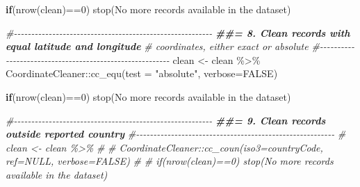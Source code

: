 \documentclass[
]{article}
\newenvironment{Shaded}{\begin{snugshade}}{\end{snugshade}}
\newcommand{\AttributeTok}[1]{\textcolor[rgb]{0.77,0.63,0.00}{#1}}
\newcommand{\CommentTok}[1]{\textcolor[rgb]{0.56,0.35,0.01}{\textit{#1}}}
\newcommand{\ConstantTok}[1]{\textcolor[rgb]{0.00,0.00,0.00}{#1}}
\newcommand{\ControlFlowTok}[1]{\textcolor[rgb]{0.13,0.29,0.53}{\textbf{#1}}}
\newcommand{\DecValTok}[1]{\textcolor[rgb]{0.00,0.00,0.81}{#1}}
\newcommand{\DocumentationTok}[1]{\textcolor[rgb]{0.56,0.35,0.01}{\textbf{\textit{#1}}}}
\newcommand{\FunctionTok}[1]{\textcolor[rgb]{0.00,0.00,0.00}{#1}}
\newcommand{\NormalTok}[1]{#1}
\newcommand{\OtherTok}[1]{\textcolor[rgb]{0.56,0.35,0.01}{#1}}
\newcommand{\SpecialCharTok}[1]{\textcolor[rgb]{0.00,0.00,0.00}{#1}}
\newcommand{\StringTok}[1]{\textcolor[rgb]{0.31,0.60,0.02}{#1}}
\begin{document}
\begin{Shaded}
\begin{Highlighting}[]
\ControlFlowTok{if}\NormalTok{(}\FunctionTok{nrow}\NormalTok{(clean)}\SpecialCharTok{==}\DecValTok{0}\NormalTok{) }\FunctionTok{stop}\NormalTok{(}\StringTok{\textquotesingle{}No more records available in the dataset\textquotesingle{}}\NormalTok{)}

\CommentTok{\#{-}{-}{-}{-}{-}{-}{-}{-}{-}{-}{-}{-}{-}{-}{-}{-}{-}{-}{-}{-}{-}{-}{-}{-}{-}{-}{-}{-}{-}{-}{-}{-}{-}{-}{-}{-}{-}{-}{-}{-}{-}{-}{-}{-}{-}{-}{-}{-}{-}{-}{-}{-}{-}{-}{-}{-}{-}}
\DocumentationTok{\#\#= 8. Clean records with equal latitude and longitude}
\CommentTok{\#      coordinates, either exact or absolute}
\CommentTok{\#{-}{-}{-}{-}{-}{-}{-}{-}{-}{-}{-}{-}{-}{-}{-}{-}{-}{-}{-}{-}{-}{-}{-}{-}{-}{-}{-}{-}{-}{-}{-}{-}{-}{-}{-}{-}{-}{-}{-}{-}{-}{-}{-}{-}{-}{-}{-}{-}{-}{-}{-}{-}{-}{-}{-}{-}{-}}
\NormalTok{clean }\OtherTok{\textless{}{-}}\NormalTok{ clean }\SpecialCharTok{\%\textgreater{}\%}
\NormalTok{  CoordinateCleaner}\SpecialCharTok{::}\FunctionTok{cc\_equ}\NormalTok{(}\AttributeTok{test =} \StringTok{"absolute"}\NormalTok{, }\AttributeTok{verbose=}\ConstantTok{FALSE}\NormalTok{)}

\ControlFlowTok{if}\NormalTok{(}\FunctionTok{nrow}\NormalTok{(clean)}\SpecialCharTok{==}\DecValTok{0}\NormalTok{) }\FunctionTok{stop}\NormalTok{(}\StringTok{\textquotesingle{}No more records available in the dataset\textquotesingle{}}\NormalTok{)}

\CommentTok{\#{-}{-}{-}{-}{-}{-}{-}{-}{-}{-}{-}{-}{-}{-}{-}{-}{-}{-}{-}{-}{-}{-}{-}{-}{-}{-}{-}{-}{-}{-}{-}{-}{-}{-}{-}{-}{-}{-}{-}{-}{-}{-}{-}{-}{-}{-}{-}{-}{-}{-}{-}{-}{-}{-}{-}{-}{-}}
\DocumentationTok{\#\#= 9. Clean records outside reported country}
\CommentTok{\#{-}{-}{-}{-}{-}{-}{-}{-}{-}{-}{-}{-}{-}{-}{-}{-}{-}{-}{-}{-}{-}{-}{-}{-}{-}{-}{-}{-}{-}{-}{-}{-}{-}{-}{-}{-}{-}{-}{-}{-}{-}{-}{-}{-}{-}{-}{-}{-}{-}{-}{-}{-}{-}{-}{-}{-}{-}}
\CommentTok{\# clean \textless{}{-} clean \%\textgreater{}\%}
\CommentTok{\#}
\CommentTok{\#   CoordinateCleaner::cc\_coun(iso3=\textquotesingle{}countryCode\textquotesingle{}, ref=NULL, verbose=FALSE)}
\CommentTok{\#}
\CommentTok{\# if(nrow(clean)==0) stop(\textquotesingle{}No more records available in the dataset\textquotesingle{})}


\end{Highlighting}
\end{Shaded}
\end{document}
